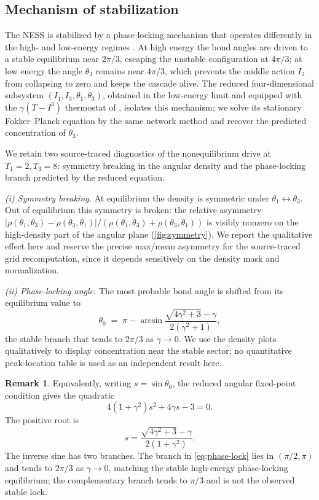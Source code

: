 \documentclass[11pt,a4paper]{article}
\theoremstyle{definition}
\newtheorem{remark}[theorem]{Remark}
\numberwithin{equation}{section}   %
\begin{document}
\subsection{Mechanism of stabilization}\label{sec:stabilization}

The NESS is stabilized by a phase-locking mechanism that operates differently in
the high- and low-energy regimes \cite{HLNS}. At high energy the bond angles are
driven to a stable equilibrium near $2\pi/3$, escaping the unstable
configuration at $4\pi/3$; at low energy the angle $\theta_3$ remains near
$4\pi/3$, which prevents the middle action $I_2$ from collapsing to zero and
keeps the cascade alive. The reduced four-dimensional subsystem
$(I_1,I_3,\theta_1,\theta_3)$, obtained in the low-energy limit and equipped
with the $\gamma(T-I^3)$ thermostat of \cite{HLNS}, isolates this mechanism; we
solve its stationary Fokker--Planck equation by the same network method and
recover the predicted concentration of $\theta_3$.

We retain two source-traced diagnostics of the nonequilibrium drive at
$T_1=2,T_3=8$: symmetry breaking in the angular density and the phase-locking
branch predicted by the reduced equation.

\emph{(i) Symmetry breaking.} At equilibrium the density is symmetric under
$\theta_1\leftrightarrow\theta_3$. Out of equilibrium this symmetry is broken:
the relative asymmetry
$|\rho(\theta_1,\theta_3)-\rho(\theta_3,\theta_1)|/
(\rho(\theta_1,\theta_3)+\rho(\theta_3,\theta_1))$ is visibly nonzero on the
high-density part of the angular plane (\cref{fig:symmetry}). We report the
qualitative effect here and reserve the precise max/mean asymmetry for the
source-traced grid recomputation, since it depends sensitively on the density
mask and normalization.

\emph{(ii) Phase-locking angle.} The most probable bond angle is shifted from
its equilibrium value to
\begin{equation}\label{eq:phase-lock}
  \theta_0 \;=\; \pi-\arcsin\!\frac{\sqrt{4\gamma^2+3}-\gamma}{2(\gamma^2+1)},
\end{equation}
the stable branch that tends to $2\pi/3$ as $\gamma\to0$. We use the density
plots qualitatively to display concentration near the stable sector; no
quantitative peak-location table is used as an independent result here.

\begin{remark}\label{rem:eq47}
Equivalently, writing $s=\sin\theta_0$, the reduced angular fixed-point
condition gives the quadratic
\[
  4(1+\gamma^2)s^2+4\gamma s-3=0 .
\]
The positive root is
\[
  s=\frac{\sqrt{4\gamma^2+3}-\gamma}{2(1+\gamma^2)} .
\]
The inverse sine has two branches. The branch in \eqref{eq:phase-lock} lies in
$(\pi/2,\pi)$ and tends to $2\pi/3$ as $\gamma\to0$, matching the stable
high-energy phase-locking equilibrium; the complementary branch tends to
$\pi/3$ and is not the observed stable lock.
\end{remark}
\end{document}
